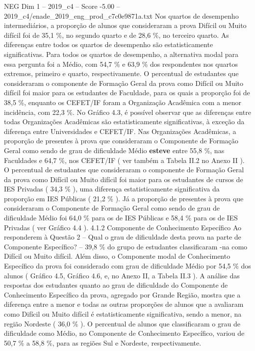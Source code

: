 \begin{textsample}{NEG Dim 1 – 2019\_c4 – Score -5.00 – 2019\_c4/enade\_2019\_eng\_prod\_c7c0e9871a.txt}
Nos quartos de desempenho intermediários, a proporção de alunos que consideraram a prova Difícil ou Muito difícil foi de 35,1 \%, no segundo quarto e de 28,6 \%, no terceiro quarto.
As diferenças entre todos os quartos de desempenho são estatisticamente significativas.
Para todos os quartos de desempenho, a alternativa modal para essa pergunta foi a Médio, com 54,7 \% e 63,9 \% dos respondentes nos quartos extremos, primeiro e quarto, respectivamente.
O percentual de estudantes que consideraram o componente de Formação Geral da prova como Difícil ou Muito difícil foi maior para os estudantes de Faculdade, para os quais a proporção foi de 38,5 \%, enquanto os CEFET/IF foram a Organização Acadêmica com a menor incidência, com 22,3 \%.
No Gráfico 4.3, é possível observar que as diferenças entre todas Organizações Acadêmicas são estatisticamente significativas, à exceção da diferença entre Universidades e CEFET/IF.
Nas Organizações Acadêmicas, a proporção de presentes à prova que consideraram o Componente de Formação Geral como sendo de grau de dificuldade Médio \textbf{esteve} entre 55,8 \%, nas Faculdades e 64,7 \%, nos CEFET/IF ( ver também a Tabela II.2 no Anexo II ).
O percentual de estudantes que consideraram o componente de Formação Geral da prova como Difícil ou Muito difícil foi maior para os estudantes de cursos de IES Privadas ( 34,3 \% ), uma diferença estatisticamente significativa da proporção em IES Públicas ( 21,2 \% ).
Já a proporção de presentes à prova que consideraram o Componente de Formação Geral como sendo de grau de dificuldade Médio foi 64,0 \% para os de IES Públicas e 58,4 \% para os de IES Privadas ( ver Gráfico 4.4 ). 4.1.2 Componente de Conhecimento Específico Ao responderem à Questão 2 – Qual o grau de dificuldade desta prova na parte de Componente Específico? – 39,8 \% do grupo de estudantes classificaram -na como Difícil ou Muito difícil.
Além disso, o Componente modal de Conhecimento Específico da prova foi considerado com grau de dificuldade Médio por 54,5 \% dos alunos ( Gráfico 4.5, Gráfico 4.6, e, no Anexo II, a Tabela II.3 ).
A análise das respostas dos estudantes quanto ao grau de dificuldade do Componente de Conhecimento Específico da prova, agregado por Grande Região, mostra que a diferença entre a menor e todas as outras proporções de alunos que a avaliaram como Difícil ou Muito difícil é estatisticamente significativa, sendo a menor, na região Nordeste ( 36,0 \% ).
O percentual de alunos que classificaram o grau de dificuldade como Médio, no Componente de Conhecimento Específico, variou de 50,7 \% a 58,8 \%, para as regiões Sul e Nordeste, respectivamente.

\end{textsample}
